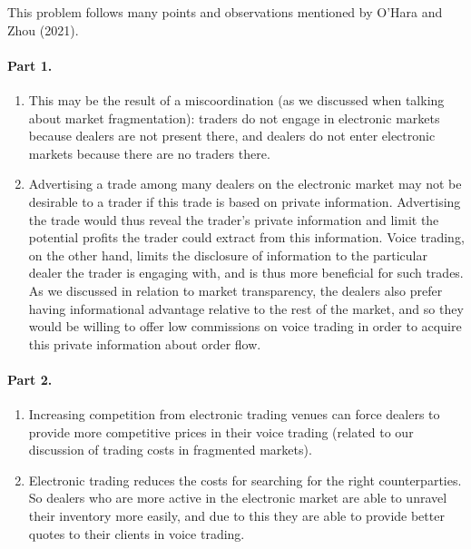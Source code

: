 \begin{solution}
	This problem follows many points and observations mentioned by O'Hara and Zhou (2021).\footnotemark
	
	\paragraph{Part 1.}
	\begin{enumerate}[label=(\alph{enumi})]
		\item This may be the result of a miscoordination (as we discussed when talking about market fragmentation): traders do not engage in electronic markets because dealers are not present there, and dealers do not enter electronic markets because there are no traders there.
		
		\item Advertising a trade among many dealers on the electronic market may not be desirable to a trader if this trade is based on private information. Advertising the trade would thus reveal the trader's private information and limit the potential profits the trader could extract from this information. Voice trading, on the other hand, limits the disclosure of information to the particular dealer the trader is engaging with, and is thus more beneficial for such trades. As we discussed in relation to market transparency, the dealers also prefer having informational advantage relative to the rest of the market, and so they would be willing to offer low commissions on voice trading in order to acquire this private information about order flow.
	\end{enumerate}
	
	\paragraph{Part 2.}
	\begin{enumerate}[label=(\alph{enumi})]
		\item Increasing competition from electronic trading venues can force dealers to provide more competitive prices in their voice trading (related to our discussion of trading costs in fragmented markets).
		
		\item Electronic trading reduces the costs for searching for the right counterparties. So dealers who are more active in the electronic market are able to unravel their inventory more easily, and due to this they are able to provide better quotes to their clients in voice trading.
		

\end{enumerate}
\end{solution}
